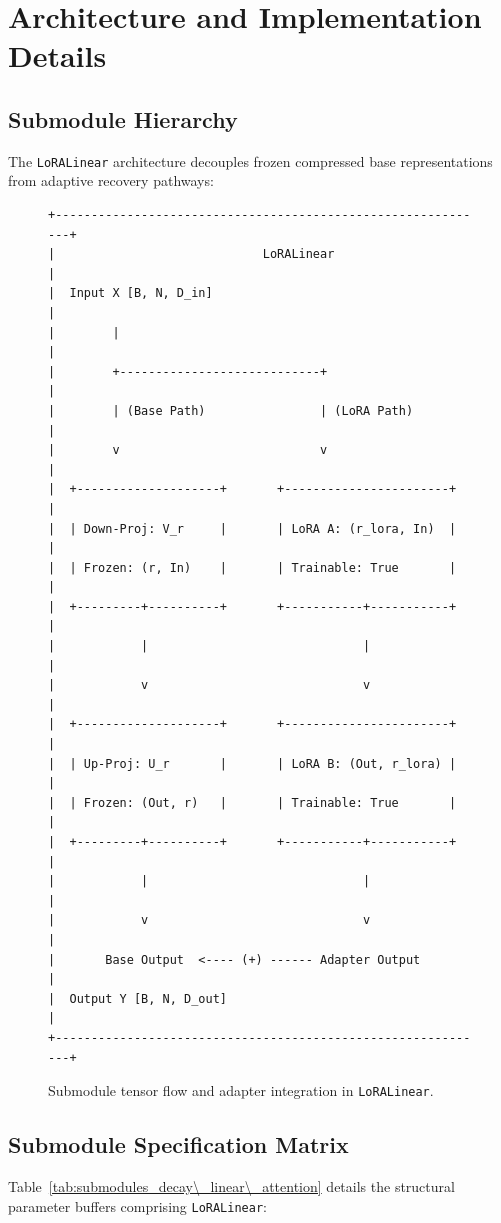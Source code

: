 \section{Architecture and Implementation Details}

\subsection{Submodule Hierarchy}
The \texttt{LoRALinear} architecture decouples frozen compressed base representations from adaptive recovery pathways:

\begin{figure}[H]
\centering
\begin{verbatim}
+-------------------------------------------------------------+
|                             LoRALinear                      |
|  Input X [B, N, D_in]                                       |
|        |                                                    |
|        +----------------------------+                       |
|        | (Base Path)                | (LoRA Path)           |
|        v                            v                       |
|  +--------------------+       +-----------------------+     |
|  | Down-Proj: V_r     |       | LoRA A: (r_lora, In)  |     |
|  | Frozen: (r, In)    |       | Trainable: True       |     |
|  +---------+----------+       +-----------+-----------+     |
|            |                              |                 |
|            v                              v                 |
|  +--------------------+       +-----------------------+     |
|  | Up-Proj: U_r       |       | LoRA B: (Out, r_lora) |     |
|  | Frozen: (Out, r)   |       | Trainable: True       |     |
|  +---------+----------+       +-----------+-----------+     |
|            |                              |                 |
|            v                              v                 |
|       Base Output  <---- (+) ------ Adapter Output          |
|  Output Y [B, N, D_out]                                     |
+-------------------------------------------------------------+
\end{verbatim}
\caption{Submodule tensor flow and adapter integration in \texttt{LoRALinear}.}
\end{figure}

\subsection{Submodule Specification Matrix}
Table~\ref{tab:submodules_decay\_linear\_attention} details the structural parameter buffers comprising \texttt{LoRALinear}:

